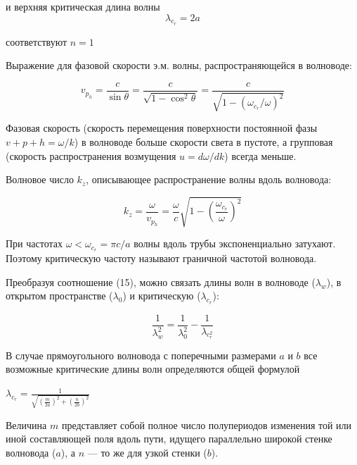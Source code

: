 \documentclass[a4paper]{article}
\begin{document}
и верхняя критическая длина волны
\begin{equation}
    \lambda_c_r = 2a
\end{equation}

соответствуют $n = 1$ \par

Выражение для фазовой скорости э.м. волны, распространяющейся в волноводе:

\begin{equation}
    v_p_h = \frac{c}{\sin \theta} = \frac{c}{\sqrt{1 - \cos^2\theta}} = \frac{c}{\sqrt{1 - (\omega_c_r/\omega)^2}}
\end{equation}

Фазовая скорость (скорость перемещения поверхности постоянной фазы $v+p+h = \omega / k$) в волноводе больше скорости света в пустоте, а групповая (скорость распространения возмущения $u = d\omega / dk$) всегда меньше.

Волновое число $k_z$, описывающее распространение волны вдоль волновода:

\begin{equation}
    k_z = \frac{\omega}{v_p_h} = \frac{\omega}{c}\sqrt{1 - (\frac{\omega_c_r}{\omega})^2}
\end{equation}

При частотах $\omega < \omega_c_r = \pi c/a$ волны вдоль трубы экспоненциально затухают. Поэтому критическую частоту называют граничной частотой волновода.

Преобразуя соотношение (15), можно связать длины волн в волноводе ($\lambda_w$), в открытом пространстве ($\lambda_0$) и критическую ($\lambda_c_r$):

\begin{equation}
    \frac{1}{\lambda_w^2} = \frac{1}{\lambda_0^2} - \frac{1}{\lambda_c_r^2}
\end{equation}

В случае прямоугольного волновода с поперечными размерами $a$ и $b$ все возможные критические длины волн определяются общей формулой

\begin{center}
    $\lambda_c_r = \frac{1}{\sqrt{(\frac{m}{2a})^2 + (\frac{n}{2b})^2}}$
\end{center}

Величина $m$ представляет собой полное число полупериодов изменения той или иной составляющей поля вдоль пути, идущего параллельно широкой стенке волновода ($a$), а $n$ — то же для узкой стенки ($b$). \par
\end{document}
